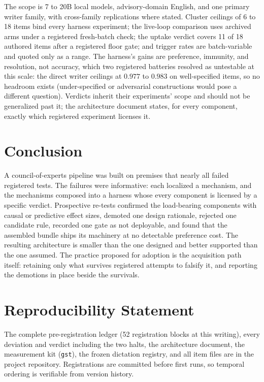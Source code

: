 \documentclass[11pt]{article}
\begin{document}
The scope is 7 to 20B local models, advisory-domain English, and one
primary writer family, with cross-family replications where stated.
Cluster ceilings of 6 to 18 items bind every harness experiment; the
live-loop comparison uses archived arms under a registered fresh-batch
check; the uptake verdict covers 11 of 18 authored items after a
registered floor gate; and trigger rates are batch-variable and quoted
only as a range. The harness's gains are preference, immunity, and
resolution, not accuracy, which two registered batteries resolved as
untestable at this scale: the direct writer ceilings at $0.977$ to
$0.983$ on well-specified items, so no headroom exists (under-specified
or adversarial constructions would pose a different question). Verdicts
inherit their experiments' scope and should not be generalized past it;
the architecture document states, for every component, exactly which
registered experiment licenses it.

\section{Conclusion}
\label{sec:conclusion}

A council-of-experts pipeline was built on premises that nearly all
failed registered tests. The failures were informative: each localized
a mechanism, and the mechanisms composed into a harness whose every
component is licensed by a specific verdict. Prospective re-tests
confirmed the load-bearing components with causal or predictive effect
sizes, demoted one design rationale, rejected one candidate rule,
recorded one gate as not deployable, and found that the assembled
bundle ships its machinery at no detectable preference cost. The
resulting architecture is smaller than the one designed and better
supported than the one assumed. The practice proposed for adoption is
the acquisition path itself: retaining only what survives registered
attempts to falsify it, and reporting the demotions in place beside the
survivals.

\section*{Reproducibility Statement}

The complete pre-registration ledger (52 registration blocks at this
writing), every deviation and verdict including the two halts, the
architecture document, the measurement kit (\texttt{gst}), the frozen
dictation registry, and all item files are in the project repository.
Registrations are committed before first runs, so temporal ordering is
verifiable from version history.
\end{document}
